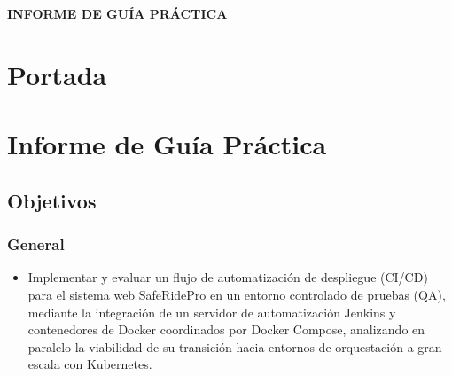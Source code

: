 \documentclass{article}
\begin{document}
\begin{center}
    {\large \textbf{INFORME DE GUÍA PRÁCTICA}} \\
\end{center}

\section{Portada}

\section{Informe de Guía Práctica}
\subsection{Objetivos}

\subsubsection{General}
\begin{itemize}
    \item Implementar y evaluar un flujo de automatización de despliegue (CI/CD) para el sistema web SafeRidePro en un entorno controlado de pruebas (QA), mediante la integración de un servidor de automatización Jenkins y contenedores de Docker coordinados por Docker Compose, analizando en paralelo la viabilidad de su transición hacia entornos de orquestación a gran escala con Kubernetes.
\end{itemize}
\end{document}

